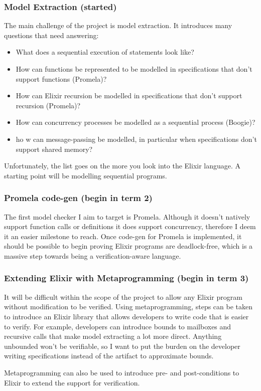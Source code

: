 \subsubsection{Model Extraction (started)}
The main challenge of the project is model extraction. It introduces many questions that need answering:
\begin{itemize}
    \item What does a sequential execution of statements look like?
    \item How can functions be represented to be modelled in specifications that don't support functions (Promela)?
    \item How can Elixir recursion be modelled in specifications that don't support recursion (Promela)?
    \item How can concurrency processes be modelled as a sequential process (Boogie)?
    \item ho
    w can message-passing be modelled, in particular when specifications don't support shared memory?
\end{itemize}
Unfortunately, the list goes on the more you look into the Elixir language. A starting point will be modelling sequential programs.
\subsubsection{Promela code-gen (begin in term 2)}
The first model checker I aim to target is Promela. Although it doesn't natively support function calls or definitions it does support concurrency, therefore I deem it an easier milestone to reach. Once code-gen for Promela is implemented, it should be possible to begin proving Elixir programs are deadlock-free, which is a massive step towards being a verification-aware language.
\subsubsection{Extending Elixir with Metaprogramming (begin in term 3)}
It will be difficult within the scope of the project to allow any Elixir program without modification to be verified. Using metaprogramming, steps can be taken to introduce an Elixir library that allows developers to write code that is easier to verify. For example, developers can introduce bounds to mailboxes and recursive calls that make model extracting a lot more direct. Anything unbounded won't be verifiable, so I want to put the burden on the developer writing specifications instead of the artifact to approximate bounds.
\par
Metaprogramming can also be used to introduce pre- and post-conditions to Elixir to extend the support for verification.
